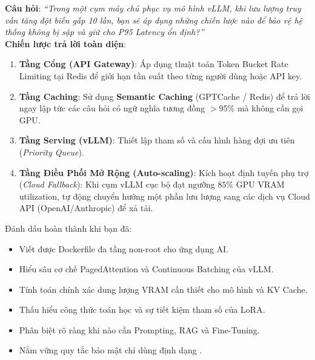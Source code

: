 \begin{interviewbox}
\textbf{Câu hỏi}: \textit{``Trong một cụm máy chủ phục vụ mô hình vLLM, khi lưu lượng truy vấn tăng đột biến gấp 10 lần, bạn sẽ áp dụng những chiến lược nào để bảo vệ hệ thống không bị sập và giữ cho P95 Latency ổn định?''}\\
\textbf{Chiến lược trả lời toàn diện}:
\begin{enumerate}
  \item \textbf{Tầng Cổng (API Gateway)}: Áp dụng thuật toán Token Bucket Rate Limiting tại Redis để giới hạn tần suất theo từng người dùng hoặc API key.
  \item \textbf{Tầng Caching}: Sử dụng \textbf{Semantic Caching} (GPTCache / Redis) để trả lời ngay lập tức các câu hỏi có ngữ nghĩa tương đồng $>95\%$ mà không cần gọi GPU.
  \item \textbf{Tầng Serving (vLLM)}: Thiết lập tham số  và cấu hình hàng đợi ưu tiên (\textit{Priority Queue}).
  \item \textbf{Tầng Điều Phối Mở Rộng (Auto-scaling)}: Kích hoạt định tuyến phụ trợ (\textit{Cloud Fallback}): Khi cụm vLLM cục bộ đạt ngưỡng $85\%$ GPU VRAM utilization, tự động chuyển hướng một phần lưu lượng sang các dịch vụ Cloud API (OpenAI/Anthropic) để xả tải.
\end{enumerate}
\end{interviewbox}

\begin{checkpointbox}
Đánh dấu hoàn thành khi bạn đã:
\begin{itemize}
  \item[$\square$] Viết được Dockerfile đa tầng non-root cho ứng dụng AI.
  \item[$\square$] Hiểu sâu cơ chế PagedAttention và Continuous Batching của vLLM.
  \item[$\square$] Tính toán chính xác dung lượng VRAM cần thiết cho mô hình và KV Cache.
  \item[$\square$] Thấu hiểu công thức toán học và sự tiết kiệm tham số của LoRA.
  \item[$\square$] Phân biệt rõ ràng khi nào cần Prompting, RAG và Fine-Tuning.
  \item[$\square$] Nắm vững quy tắc bảo mật chỉ dùng định dạng .
\end{itemize}
\end{checkpointbox}
